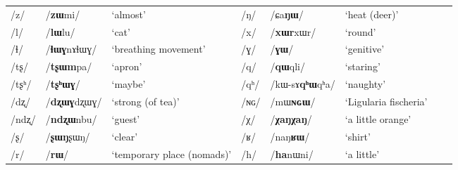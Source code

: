 \documentclass[oneside,a4paper,11pt]{article}
\newcommand{\ipa}[1]{\mbox{\phon/#1/}}
\begin{document}
\begin{table}
{\begin{tabular}{lll|lllll}
 \ipa{z} & 	  \ipa{\textbf{zɯ}mi}   & 	 `almost' & \ipa{ŋ} & 	\ipa{ɕa\textbf{ŋɯ}}   & 	 `heat (deer)' \\ 
 \ipa{l} & 	  \ipa{\textbf{lɯ}lu}   & 	 `cat' & \ipa{x} & 	\ipa{\textbf{xɯr}xɯr}   & 	 `round' \\ 
 \ipa{ɬ} & 	  \ipa{\textbf{ɬɯɣ}nɤɬɯɣ}   & 	 `breathing movement' & \ipa{ɣ} & 	\ipa{\textbf{ɣɯ}}   & 	 `genitive' \\ 
 \ipa{tʂ} & 	 \ipa{\textbf{tʂɯm}pa}   & 	 `apron' & \ipa{q} & 	\ipa{\textbf{qɯ}qli}   & 	 `staring' \\ 
 \ipa{tʂʰ} & 	  \ipa{\textbf{tʂʰɯɣ}}   & 	 `maybe' & \ipa{qʰ} & 	\ipa{kɯ-sɤ\textbf{qʰɯ}qʰa}   & 	 `naughty' \\ 
 \ipa{dʐ} & 	\ipa{\textbf{dʐɯɣ}dʐɯɣ}   & 	 `strong (of tea)' & \ipa{ɴɢ} & 	\ipa{mɯ\textbf{ɴɢɯ}}  & 	 `Ligularia fischeria' \\ 
 \ipa{ndʐ} & 	\ipa{\textbf{ndʐɯ}nbu}   & 	 `guest' & \ipa{χ} & 	\ipa{\textbf{χaŋχaŋ}}   & 	 `a little orange' \\ 
 \ipa{ʂ} & 	\ipa{\textbf{ʂɯŋ}ʂɯŋ}   & 	 `clear' & \ipa{ʁ} & 	\ipa{naŋ\textbf{ʁɯ}}   & 	 `shirt' \\ 
 \ipa{r} & 	\ipa{\textbf{rɯ}}   & 	 `temporary place (nomads)' & 	  \ipa{h}&\ipa{\textbf{ha}nɯni} 	 & `a little'	 \\ 
\bottomrule
\end{tabular}}
\end{table}
\end{document}
